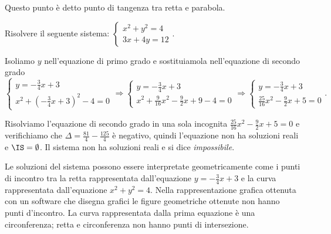 \begin{exrig}
\begin{esempio}
\begin{multicols}{2}
Questo punto è detto punto di tangenza tra retta e parabola.
\begin{center}

\end{center}
 \end{multicols}
\end{esempio}

\begin{esempio}
Risolvere il seguente sistema: $\left\{\begin{array}{l}x^2+y^2=4 
\\3x+4y=12\end{array}\right..$

Isoliamo $y$ nell'equazione di primo grado e sostituiamola nell'equazione di 
secondo grado 
\[\left\{\begin{array}{l}y=-\frac 3 4x+3 \\
x^2+\left(-\frac 3 4x+3\right)^2-4=0\end{array}\right. 
\Rightarrow\left\{\begin{array}{l}y=-\frac 3 4x+3 \\
x^2+\frac 9{16}x^2-\frac 9 2x+9-4=0\end{array}\right. 
\Rightarrow\left\{\begin{array}{l}y=-\frac 3 4x+3 \\
\frac{25}{16}x^2-\frac{9}{2}x+5=0\end{array}\right..\]

Risolviamo l'equazione di secondo grado in una sola incognita 
$\frac{25}{16}x^2-\frac 9 2x+5=0$ e verifichiamo che $\Delta =\frac{81} 
4-\frac{125} 4$ è negativo, quindi l'equazione non ha soluzioni reali e 
$\IS=\emptyset $. Il sistema non ha soluzioni reali e si dice 
\emph{impossibile}.

\begin{multicols}{2}
Le soluzioni del sistema possono essere interpretate geometricamente come i 
punti di incontro tra la retta rappresentata dall'equazione $y=-\frac 3 4x+3$ e 
la curva rappresentata dall'equazione $x^2+y^2=4$. Nella rappresentazione 
grafica ottenuta con un software che disegna grafici le figure geometriche 
ottenute non hanno punti d'incontro.
La curva rappresentata dalla prima equazione è una circonferenza; retta e 
circonferenza non hanno punti di intersezione.
\begin{center}

\end{center}
 \end{multicols}
\end{esempio}
\end{exrig}

